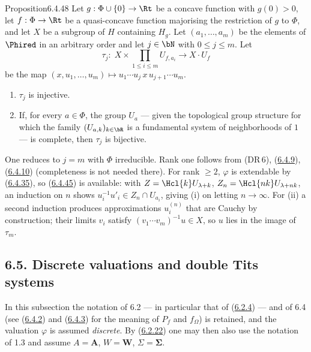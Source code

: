 \documentclass[12pt,a4paper,oneside,english]{smfart}
\makeatletter
\newcommand{\btanchor}[1]{\leavevmode\Hy@raisedlink{\hypertarget{bt:#1}{}}}
\newcommand{\btref}[1]{\hyperlink{bt:#1}{#1}}
\newcommand{\btsecB}[2]{%
  \par\needspace{4\baselineskip}\phantomsection
  \subsection*{#2}%
  \ifx\relax#1\relax\else\btanchor{#1}\fi}
\theoremstyle{definition}
\theoremstyle{bt}
\makeatother
\begin{document}
\begin{bt}{Proposition}{6.4.48}\btanchor{6.4.48}
Let $g:\Phi\cup\{0\}\to\Rt$ be a concave function with $g(0)>0$, let
$f:\Phi\to\Rt$ be a quasi-concave function majorising the restriction of
$g$ to $\Phi$, and let $X$ be a subgroup of $H$ containing $H_g$. Let
$(a_1,\dots,a_m)$ be the elements of $\Phired$ in an arbitrary order and
let $j\in\bN$ with $0\le j\le m$. Let
\[
  \tau_j:\;X\times\prod_{1\le i\le m}U_{f,a_i}\longrightarrow X\cdot U_f
\]
be the map $(x,u_1,\dots,u_m)\mapsto u_1\cdots u_j\,x\,u_{j+1}\cdots u_m$.
\begin{enumerate}
\item[(i)] $\tau_j$ is injective.
\item[(ii)] If, for every $a\in\Phi$, the group $U_a$ --- given the
  topological group structure for which the family $(U_{a,k})_{k\in\bR}$
  is a fundamental system of neighborhoods of $1$ --- is complete, then
  $\tau_j$ is bijective.
\end{enumerate}
\end{bt}

\begin{sketch}
One reduces to $j=m$ with $\Phi$ irreducible. Rank one follows from
(DR\,6), (\btref{6.4.9}), (\btref{6.4.10}) (completeness is not needed there). For rank
$\ge2$, $\varphi$ is extendable by (\btref{6.4.35}), so (\btref{6.4.45}) is available:
with $Z=\Hcl{k}U_{\lambda+k}$, $Z_n=\Hcl{nk}U_{\lambda+nk}$, an
induction on $n$ shows $u_i^{-1}u'_i\in Z_n\cap U_{a_i}$, giving (i) on
letting $n\to\infty$. For (ii) a second induction produces
approximations $u_i^{(n)}$ that are Cauchy by construction; their limits
$v_i$ satisfy $(v_1\cdots v_m)^{-1}u\in X$, so $u$ lies in the image of
$\tau_m$.
\end{sketch}


\btsecB{6.5}{6.5. Discrete valuations and double Tits systems}


\noindent
In this subsection the notation of 6.2 --- in particular that of (\btref{6.2.4})
--- and of 6.4 (see (\btref{6.4.2}) and (\btref{6.4.3}) for the meaning of $P_f$ and
$f_\Omega$) is retained, and the valuation $\varphi$ is assumed
\emph{discrete}. By (\btref{6.2.22}) one may then also use the notation of 1.3
and assume $A=\mathbf{A}$, $W=\mathbf{W}$, $\Sigma=\boldsymbol{\Sigma}$.
\end{document}
